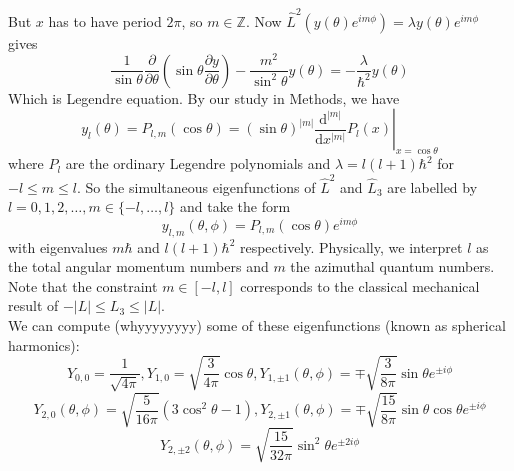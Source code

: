 But $x$ has to have period $2\pi$, so $m\in\mathbb Z$.
Now $\hat{L}^2(y(\theta)e^{im\phi})=\lambda y(\theta)e^{im\phi}$ gives
$$\frac{1}{\sin\theta}\frac{\partial}{\partial\theta}\left( \sin\theta\frac{\partial y}{\partial\theta} \right)-\frac{m^2}{\sin^2\theta}y(\theta)=-\frac{\lambda}{\hbar^2}y(\theta)$$
Which is Legendre equation.
By our study in Methods, we have
$$y_l(\theta)=P_{l,m}(\cos\theta)=(\sin\theta)^{|m|}\left.\frac{\mathrm d^{|m|}}{\mathrm dx^{|m|}}P_l(x)\right|_{x=\cos\theta}$$
where $P_l$ are the ordinary Legendre polynomials and $\lambda=l(l+1)\hbar^2$ for $-l\le m\le l$.
So the simultaneous eigenfunctions of $\hat{L}^2$ and $\hat{L}_3$ are labelled by $l=0,1,2,\ldots,m\in\{-l,\ldots,l\}$ and take the form
$$y_{l,m}(\theta,\phi)=P_{l,m}(\cos\theta)e^{im\phi}$$
with eigenvalues $m\hbar$ and $l(l+1)\hbar^2$ respectively.
Physically, we interpret $l$ as the total angular momentum numbers and $m$ the azimuthal quantum numbers.
Note that the constraint $m\in[-l,l]$ corresponds to the classical mechanical result of $-|L|\le L_3\le |L|$.\\
We can compute (whyyyyyyyy) some of these eigenfunctions (known as spherical harmonics):
$$Y_{0,0}=\frac{1}{\sqrt{4\pi}},Y_{1,0}=\sqrt{\frac{3}{4\pi}}\cos\theta,Y_{1,\pm 1}(\theta,\phi)=\mp\sqrt{\frac{3}{8\pi}}\sin\theta e^{\pm i\phi}$$
$$Y_{2,0}(\theta,\phi)=\sqrt{\frac{5}{16\pi}}(3\cos^2\theta-1),Y_{2,\pm 1}(\theta,\phi)=\mp\sqrt{\frac{15}{8\pi}}\sin\theta\cos\theta e^{\pm i\phi}$$
$$Y_{2,\pm 2}(\theta,\phi)=\sqrt{\frac{15}{32\pi}}\sin^2\theta e^{\pm 2i\phi}$$
